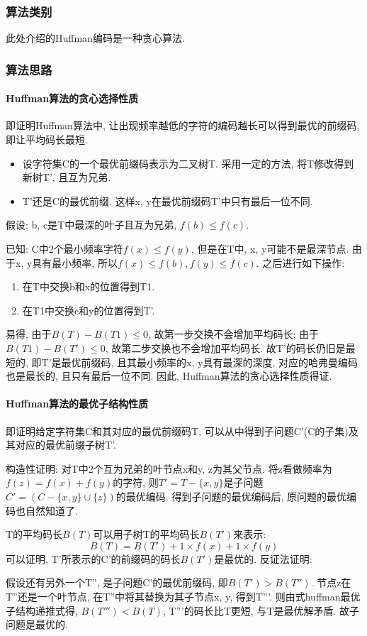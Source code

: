 \subsubsection{算法类别}
此处介绍的Huffman编码是一种贪心算法.

\subsubsection{算法思路}
\paragraph{Huffman算法的贪心选择性质}
即证明Huffman算法中, 让出现频率越低的字符的编码越长可以得到最优的前缀码,
即让平均码长最短.

\begin{itemize}
	\item 设字符集C的一个最优前缀码表示为二叉树T. 采用一定的方法, 将T修改得到新树T',
	      且互为兄弟.
	\item T'还是C的最优前缀. 这样x, y在最优前缀码T'中只有最后一位不同.
\end{itemize}

假设: b, c是T中最深的叶子且互为兄弟, $f(b)\leq f(c)$.\par
已知: C中2个最小频率字符$f(x)\leq f(y)$, 但是在T中, x, y可能不是最深节点. 由于x,
y具有最小频率, 所以$f(x)\leq f(b), f(y)\leq f(c)$. 之后进行如下操作:
\begin{enumerate}
	\item 在T中交换b和x的位置得到T1.
	\item 在T1中交换c和y的位置得到T'.
\end{enumerate}

易得, 由于$B(T) - B(T1)\leq 0$, 故第一步交换不会增加平均码长; 由于$B(T1) -
	B(T')\leq 0$, 故第二步交换也不会增加平均码长. 故T'的码长仍旧是最短的,
即T'是最优前缀码, 且其最小频率的x, y具有最深的深度, 对应的哈弗曼编码也是最长的,
且只有最后一位不同. 因此, Huffman算法的贪心选择性质得证.

\paragraph{Huffman算法的最优子结构性质} %
\label{par:Huffman算法的最优子结构性质}
即证明给定字符集C和其对应的最优前缀码T,
可以从中得到子问题C'(C的子集)及其对应的最优前缀子树T'.\par
构造性证明: 对T中2个互为兄弟的叶节点x和y, z为其父节点.
将z看做频率为$f(z)=f(x)+f(y)$的字符,
则$T'=T-\{x,y\}$是子问题$C'=(C-\{x,y\}\cup \{z\})$的最优编码.
得到子问题的最优编码后, 原问题的最优编码也自然知道了. \par
T的平均码长$B(T)$可以用子树T的平均码长$B(T')$来表示:
\begin{equation}
	B(T) = B(T') + 1\times f(x) + 1\times f(y)
\end{equation}
可以证明, T'所表示的C'的前缀码的码长$B(T')$是最优的. 反证法证明:\par
假设还有另外一个T'', 是子问题C'的最优前缀码, 即$B(T') > B(T'')$.
节点z在T''还是一个叶节点, 在T''中将其替换为其子节点x, y, 得到T'''.
则由式huffman最优子结构递推式得, $B(T''') < B(T)$, T'''的码长比T更短,
与T是最优解矛盾. 故子问题是最优的.
